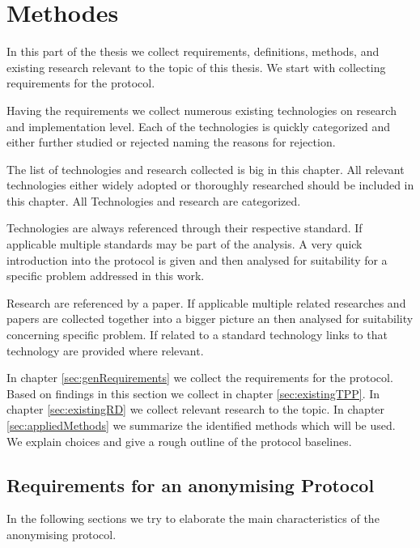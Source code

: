 

\part{Methodes}
In this part of the thesis we collect requirements, definitions, methods, and existing research relevant to the topic of this thesis. We start with collecting requirements for the protocol. 

Having the requirements we collect numerous existing technologies on research and implementation level. Each of the technologies is quickly categorized and either further studied or rejected naming the reasons for rejection.

The list of technologies and research collected is big in this chapter. All relevant technologies either widely adopted or thoroughly researched should be included in this chapter. All Technologies and research are categorized. 

Technologies are always referenced through their respective standard. If applicable multiple standards may be part of the analysis. A very quick introduction into the protocol is given and then analysed for suitability for a specific problem addressed in this work.

Research are referenced by a paper. If applicable multiple related researches and papers are collected together into a bigger picture an then analysed for suitability concerning specific problem. If related to a standard technology links to that technology are provided where relevant.

In chapter \ref{sec:genRequirements} we collect the requirements for the protocol. Based on findings in this section we collect in chapter \ref{sec:existingTPP}. In chapter \ref{sec:existingRD} we collect relevant research to the topic. In chapter \ref{sec:appliedMethods} we summarize the identified  methods which will be used. We explain choices and give a rough outline of the protocol baselines.

\chapter{Requirements for an anonymising Protocol\label{sec:genRequirements}}
In the following sections we try to elaborate the main characteristics of the anonymising protocol. 

